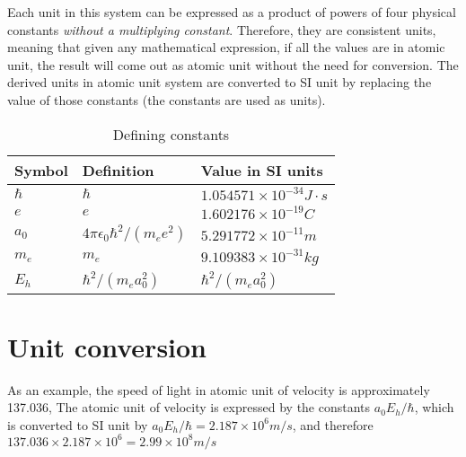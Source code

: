 \documentclass{article}
\begin{document}
Each unit in this system can be expressed as a product of powers of four physical
constants \emph{without a multiplying constant}. Therefore, they are 
consistent units, meaning that given any mathematical expression, if all the values 
are in atomic unit, the result will come out as atomic unit without the need for 
conversion.
The derived units in atomic unit system
are converted to SI unit by replacing the value of those constants (the constants
are used as units).
\begin{table}[h]
    \centering
    \caption{Defining constants}
    \begin{tabular}{|l|l|l|}
        \hline 
        \textbf{Symbol} & \textbf{Definition} & \textbf{Value in SI units} \\ \hline
        $\hbar$         & $\hbar$             &$1.054571\times 10^{-34} J\cdot s$ \\ \hline
        $e$             & $e$                 & $1.602176\times 10^{-19} C$  \\ \hline
        $a_0$           & $4\pi\epsilon_0\hbar^2/(m_ee^2)$ & $5.291772\times 10^{-11} m$  \\ \hline
        $m_e$           & $m_e$               & $9.109383\times 10^{-31} kg$ \\ \hline
        $E_h$           & $\hbar^2/(m_ea_0^2) $ & $\hbar^2/(m_e a_0^2)$ \\ \hline
    \end{tabular}
\end{table}

\section{Unit conversion}
As an example, the speed of light in atomic unit of velocity is approximately 137.036,
The atomic unit of velocity is expressed by the constants $a_0 E_h /\hbar$, which is converted 
to SI unit by $a_0 E_h / \hbar = 2.187\times10^6 m/s$, and therefore 
$137.036\times 2.187\times10^6 = 2.99 \times 10^8 m/s$
\end{document}
